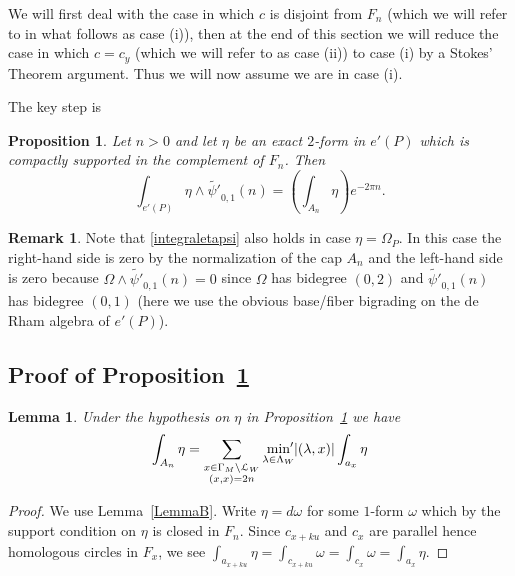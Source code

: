 \documentclass[12pt,leqno]{amsart}
\numberwithin{equation}{section}
\theoremstyle{plain}
\newtheorem{lemma}[theorem]{Lemma}
\newtheorem{proposition}[theorem]{Proposition}
\theoremstyle{definition}
\newtheorem{remark}[theorem]{Remark}
\theoremstyle{remark}
\newcommand{\G}{\Gamma}
\newcommand{\la}{\lambda}
\newcommand{\back}{\backslash}
\begin{document}
We will first deal with the case in which $c$ is disjoint from $F_n$ (which we will refer to in what follows as  case (i)), then at the end of this section  we will reduce the case in which $c=c_y$ (which we will refer to as case (ii)) to case (i) by a Stokes' Theorem argument.
Thus we will now assume we are in case (i).


The key step is 

\begin{proposition}\label{finalintegral}
Let $n>0$ and let $\eta$ be an exact $2$-form in $e'(P)$ which is compactly supported in the complement of $F_n$. Then 
\begin{equation}\label{integraletapsi}
 \int_{e'(P)} \eta \wedge \tilde{\psi'}_{0,1}(n) = \left(\int_{A_n} \eta\right) e^{ - 2 \pi n}. 
\end{equation}
\end{proposition}
\begin{remark}\label{youwillneedthis}
Note that \eqref{integraletapsi} also holds in case $\eta =\Omega_P$. In this case the right-hand side is zero by the normalization of the cap $A_n$ and the left-hand side is zero because $\Omega \wedge \tilde{\psi'}_{0,1}(n) =0$ since $\Omega$ has bidegree $(0,2)$
and $\tilde{\psi'}_{0,1}(n)$ has bidegree $(0,1)$ (here we use the obvious base/fiber bigrading on the de Rham algebra of $e'(P)$). 
\end{remark} 

\subsection{Proof of Proposition~\ref{finalintegral}}\label{8.2}


\begin{lemma}\label{LemmaA}
Under the hypothesis on $\eta$ in Proposition~\ref{finalintegral} we have
\[
 \int_{A_n} \eta = \sum_{ \substack{x\in \G_M \back \mathcal{L}_W \\ (x,x)=2n}} \min_{\la \in \Lambda_W} {\hspace{-5pt}'} |(\la,x)| \int_{a_x} \eta
\]
\end{lemma}

\begin{proof}
We use Lemma~\ref{LemmaB}. Write $\eta = d \omega$ for some $1$-form $\omega$ which by the support condition on $\eta$ is closed in $F_n$. Since $c_{x+ku}$ and  $c_x$ are parallel hence homologous circles in $F_x$, we see $\int_{a_{x+ku}} \eta = \int_{c_{x+ku}} \omega = \int_{c_x} \omega = \int_{a_x} \eta$. 
\end{proof}
\end{document}
